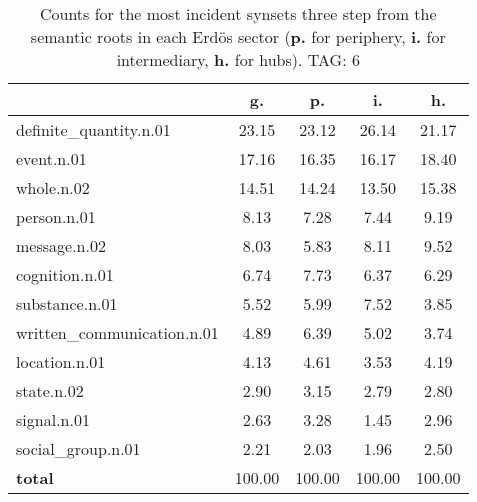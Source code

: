 \begin{table}[h!]
\begin{center}
\begin{tabular}{| l || c | c | c | c |}\hline
 & {\bf g.} & {\bf p.} & {\bf i.} & {\bf h.} \\\hline\hline
definite\_quantity.n.01 & 23.15  & 23.12  & 26.14  & 21.17 \\\hline
event.n.01 & 17.16  & 16.35  & 16.17  & 18.40 \\\hline
whole.n.02 & 14.51  & 14.24  & 13.50  & 15.38 \\\hline
person.n.01 & 8.13  & 7.28  & 7.44  & 9.19 \\\hline
message.n.02 & 8.03  & 5.83  & 8.11  & 9.52 \\\hline
cognition.n.01 & 6.74  & 7.73  & 6.37  & 6.29 \\\hline
substance.n.01 & 5.52  & 5.99  & 7.52  & 3.85 \\\hline
written\_communication.n.01 & 4.89  & 6.39  & 5.02  & 3.74 \\\hline
location.n.01 & 4.13  & 4.61  & 3.53  & 4.19 \\\hline
state.n.02 & 2.90  & 3.15  & 2.79  & 2.80 \\\hline
signal.n.01 & 2.63  & 3.28  & 1.45  & 2.96 \\\hline
social\_group.n.01 & 2.21  & 2.03  & 1.96  & 2.50 \\\hline\hline
{{\bf total}} & 100.00  & 100.00  & 100.00  & 100.00 \\\hline
\end{tabular}
\caption{Counts for the most incident synsets three step from the semantic roots in each Erd\"os sector ({\bf p.} for periphery, {\bf i.} for intermediary, {\bf h.} for hubs). TAG: 6}
\end{center}
\end{table}